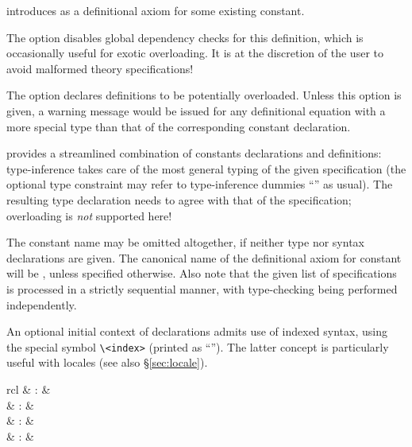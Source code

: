 \begin{isabellebody}
\begin{isamarkuptext}
\begin{descr}
  \item [\mbox{\isa{\isacommand{defs}}}~\isa{name{\isacharcolon}\ eqn}] introduces 
  as a definitional axiom for some existing constant.
  
  The  option disables global dependency checks
  for this definition, which is occasionally useful for exotic
  overloading.  It is at the discretion of the user to avoid malformed
  theory specifications!
  
  The  option declares definitions to be
  potentially overloaded.  Unless this option is given, a warning
  message would be issued for any definitional equation with a more
  special type than that of the corresponding constant declaration.
  
  \item [\mbox{\isa{\isacommand{constdefs}}}] provides a streamlined combination of
  constants declarations and definitions: type-inference takes care of
  the most general typing of the given specification (the optional
  type constraint may refer to type-inference dummies ``\isa{{\isacharunderscore}}'' as usual).  The resulting type declaration needs to agree with
  that of the specification; overloading is \emph{not} supported here!
  
  The constant name may be omitted altogether, if neither type nor
  syntax declarations are given.  The canonical name of the
  definitional axiom for constant  will be ,
  unless specified otherwise.  Also note that the given list of
  specifications is processed in a strictly sequential manner, with
  type-checking being performed independently.
  
  An optional initial context of  declarations
  admits use of indexed syntax, using the special symbol \verb|\<index>| (printed as ``\isa{{\isasymindex}}'').  The latter concept is
  particularly useful with locales (see also \S\ref{sec:locale}).

  \end{descr}%
\end{isamarkuptext}%
\isamarkuptrue%
%
\isamarkuptrue%
%
\begin{isamarkuptext}%
\begin{matharray}{rcl}
    \mbox{} & : &  \\
    \mbox{} & : &  \\
    \mbox{} & : &  \\
    \mbox{} & : &  \\
  \end{matharray}


\end{isamarkuptext}
\end{isabellebody}
